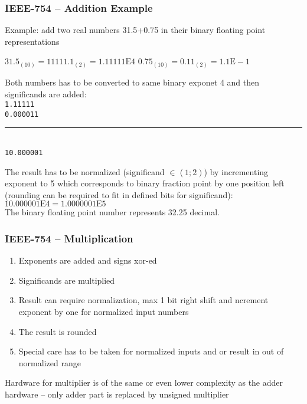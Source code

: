 \documentclass{beamer}
\begin{document}
\begin{frame}
\frametitle{IEEE-754 -- Addition Example}

Example: add two real numbers 31.5+0.75 in their binary floating point representations

$31.5_{(10)} = 11111.1_{(2)} = 1.11111\text{E}4$ \phantom{xxx} $0.75_{(10)} = 0.11_{(2)} = 1.1\text{E}-1$

\bigskip
Both numbers has to be converted to same binary exponet 4 and then significands are added:\\
\texttt{\phantom{xx}1.11111}\\
\texttt{\phantom{xx}0.000011}\vspace{-6pt}\\
\rule[0pt]{2cm}{0.4pt}\\
\texttt{\phantom{x}10.000001}
\bigskip

The result has to be normalized (significand $\in \left\langle 1; 2 \right)$) by incrementing exponent to 5 which corresponds to binary fraction point by one position left (rounding can be required to fit in defined bits for significand):\\
$10.000001\text{E}4 = 1.0000001\text{E}5$\\

The binary floating point number represents 32.25 decimal.

\end{frame}

\begin{frame}
\frametitle{IEEE-754 -- Multiplication}

\begin{enumerate}
\item Exponents are added and signs xor-ed
\item Significands are multiplied
\item Result can require normalization, max 1 bit right shift and ncrement exponent by one for normalized input numbers
\item The result is rounded
\item Special care has to be taken for normalized inputs and or result in out of normalized range
\end{enumerate}

Hardware for multiplier is of the same or even lower complexity as the adder hardware -- only adder part is replaced by unsigned multiplier

\end{frame}
\end{document}
